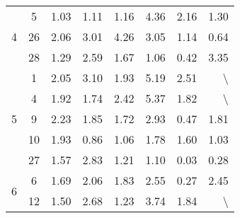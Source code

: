 \begin{longtable}[htb]{ccrrrrrr}
    \multirow{3}[0]{*}{4} & 5     & 1.03  & 1.11  & 1.16  & 4.36  & 2.16  & 1.30  \\
          & 26    & 2.06  & 3.01  & 4.26  & 3.05  & 1.14  & 0.64  \\
          & 28    & 1.29  & 2.59  & 1.67  & 1.06  & 0.42  & 3.35  \\
    \multirow{5}[0]{*}{5} & 1     & 2.05  & 3.10  & 1.93  & 5.19  & 2.51  & \textbackslash{} \\
          & 4     & 1.92  & 1.74  & 2.42  & 5.37  & 1.82  & \textbackslash{} \\
          & 9     & 2.23  & 1.85  & 1.72  & 2.93  & 0.47  & 1.81  \\
          & 10    & 1.93  & 0.86  & 1.06  & 1.78  & 1.60  & 1.03  \\
          & 27    & 1.57  & 2.83  & 1.21  & 1.10  & 0.03  & 0.28  \\
    \multirow{2}[1]{*}{6} & 6     & 1.69  & 2.06  & 1.83  & 2.55  & 0.27  & 2.45  \\
          & 12    & 1.50  & 2.68  & 1.23  & 3.74  & 1.84  & \textbackslash{} \\
	\bottomrule
\end{longtable}